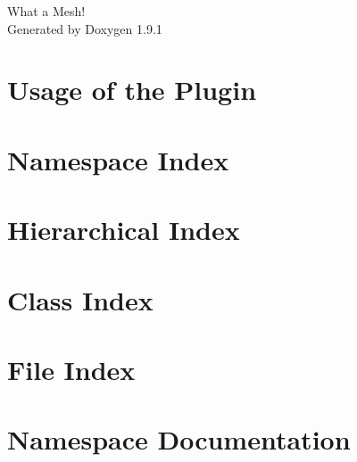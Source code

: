 \let\mypdfximage\pdfximage\def\pdfximage{\immediate\mypdfximage}\documentclass[twoside]{book}
\newcommand{\+}{\discretionary{\mbox{\scriptsize$\hookleftarrow$}}{}{}}
\newcommand{\clearemptydoublepage}{%
  \newpage{\pagestyle{empty}\cleardoublepage}%
}
\begin{document}
\raggedbottom

\hypersetup{pageanchor=false,
             bookmarksnumbered=true,
             pdfencoding=unicode
            }
\begin{titlepage}
\vspace*{7cm}
\begin{center}%
{\Large What a Mesh! }\\
\vspace*{1cm}
{\large Generated by Doxygen 1.9.1}\\
\end{center}
\end{titlepage}
\clearemptydoublepage
{}
\tableofcontents
\clearemptydoublepage
{}
\hypersetup{pageanchor=true}

\chapter{Usage of the Plugin}
\label{index}\hypertarget{index}{}
\chapter{Namespace Index}

\chapter{Hierarchical Index}

\chapter{Class Index}

\chapter{File Index}

\chapter{Namespace Documentation}








\end{document}
